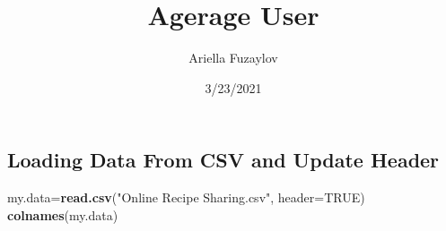 \documentclass[
]{article}
\title{Agerage User}
\author{Ariella Fuzaylov}
\date{3/23/2021}
\newenvironment{Shaded}{\begin{snugshade}}{\end{snugshade}}
\newcommand{\DataTypeTok}[1]{\textcolor[rgb]{0.13,0.29,0.53}{#1}}
\newcommand{\KeywordTok}[1]{\textcolor[rgb]{0.13,0.29,0.53}{\textbf{#1}}}
\newcommand{\NormalTok}[1]{#1}
\newcommand{\OtherTok}[1]{\textcolor[rgb]{0.56,0.35,0.01}{#1}}
\newcommand{\StringTok}[1]{\textcolor[rgb]{0.31,0.60,0.02}{#1}}
\begin{document}
\maketitle

\hypertarget{loading-data-from-csv-and-update-header}{%
\subsection{Loading Data From CSV and Update
Header}\label{loading-data-from-csv-and-update-header}}

\begin{Shaded}
\begin{Highlighting}[]
\NormalTok{my.data=}\KeywordTok{read.csv}\NormalTok{(}\StringTok{"Online Recipe Sharing.csv"}\NormalTok{, }\DataTypeTok{header=}\OtherTok{TRUE}\NormalTok{)}
\KeywordTok{colnames}\NormalTok{(my.data)}
\end{Highlighting}
\end{Shaded}
\end{document}
